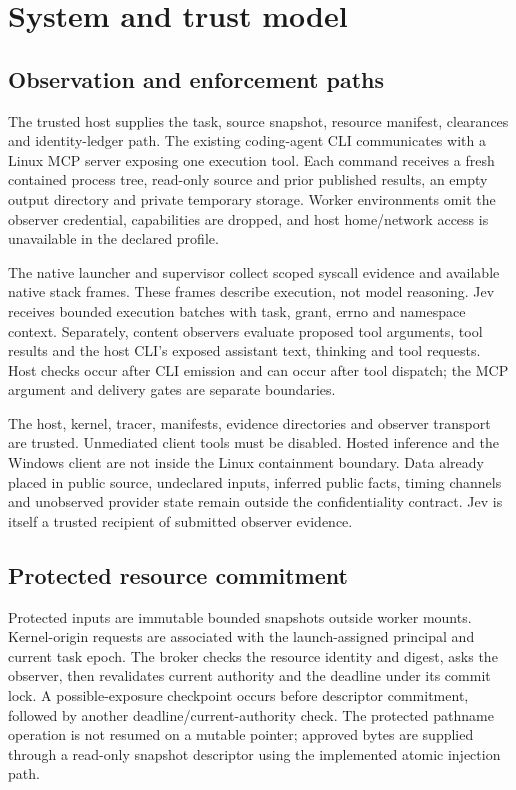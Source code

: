 \documentclass[conference]{IEEEtran}
\begin{document}
\section{System and trust model}\label{system-and-trust-model}

\subsection{Observation and enforcement paths}\label{observation-and-enforcement-paths}

The trusted host supplies the task, source snapshot, resource manifest, clearances and identity-ledger path. The existing coding-agent CLI communicates with a Linux MCP server exposing one execution tool. Each command receives a fresh contained process tree, read-only source and prior published results, an empty output directory and private temporary storage. Worker environments omit the observer credential, capabilities are dropped, and host home/network access is unavailable in the declared profile.

The native launcher and supervisor collect scoped syscall evidence and available native stack frames. These frames describe execution, not model reasoning. Jev receives bounded execution batches with task, grant, errno and namespace context. Separately, content observers evaluate proposed tool arguments, tool results and the host CLI's exposed assistant text, thinking and tool requests. Host checks occur after CLI emission and can occur after tool dispatch; the MCP argument and delivery gates are separate boundaries.

The host, kernel, tracer, manifests, evidence directories and observer transport are trusted. Unmediated client tools must be disabled. Hosted inference and the Windows client are not inside the Linux containment boundary. Data already placed in public source, undeclared inputs, inferred public facts, timing channels and unobserved provider state remain outside the confidentiality contract. Jev is itself a trusted recipient of submitted observer evidence.

\subsection{Protected resource commitment}\label{protected-resource-commitment}

Protected inputs are immutable bounded snapshots outside worker mounts. Kernel-origin requests are associated with the launch-assigned principal and current task epoch. The broker checks the resource identity and digest, asks the observer, then revalidates current authority and the deadline under its commit lock. A possible-exposure checkpoint occurs before descriptor commitment, followed by another deadline/current-authority check. The protected pathname operation is not resumed on a mutable pointer; approved bytes are supplied through a read-only snapshot descriptor using the implemented atomic injection path.
\end{document}
